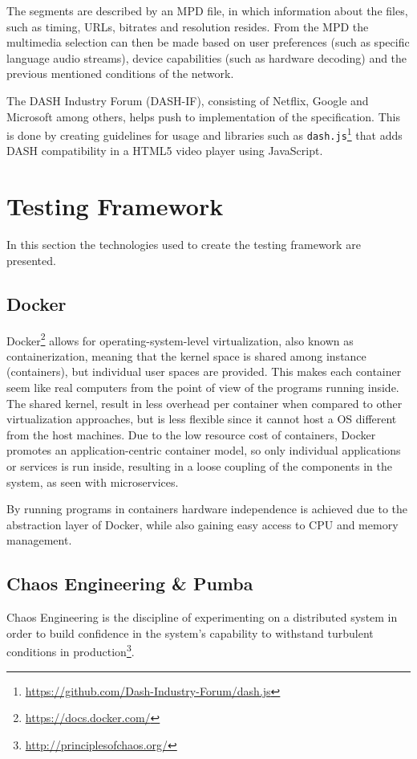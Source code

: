 The segments are described by an \ac{MPD} file, in which information about the files, such as timing, \ac{URL}s, bitrates and resolution resides. From the \ac{MPD} the multimedia selection can then be made based on user preferences (such as specific language audio streams), device capabilities (such as hardware decoding) and the previous mentioned conditions of the network.

The \ac{DASH} Industry Forum (DASH-IF), consisting of Netflix, Google and Microsoft among others, helps push to implementation of the specification\cite{ISO23009}. This is done by creating guidelines for usage and libraries such as \texttt{dash.js}\footnote{\url{https://github.com/Dash-Industry-Forum/dash.js}} that adds \ac{DASH} compatibility in a \ac{HTML}5 video player using JavaScript.

\section{Testing Framework}
In this section the technologies used to create the testing framework are presented.

\subsection{Docker}
Docker\footnote{\url{https://docs.docker.com/}} allows for operating-system-level virtualization, also known as containerization, meaning that the kernel space is shared among instance (containers), but individual user spaces are provided. This makes each container seem like real computers from the point of view of the programs running inside. 
The shared kernel, result in less overhead per container when compared to other virtualization approaches, but is less flexible since it cannot host a \ac{OS} different from the host machines. Due to the low resource cost of containers, Docker promotes an application-centric container model\cite{merkel2014docker}, so only individual applications or services is run inside, resulting in a loose coupling of the components in the system, as seen with microservices. 

By running programs in containers hardware independence is achieved due to the abstraction layer of Docker, while also gaining easy access to CPU and memory management.

\subsection{Chaos Engineering \& Pumba}
\label{sec:framework_pumba}
Chaos Engineering is the discipline of experimenting on a distributed system in order to build confidence in the system’s capability to withstand turbulent conditions in production\footnote{\url{http://principlesofchaos.org/}}.

